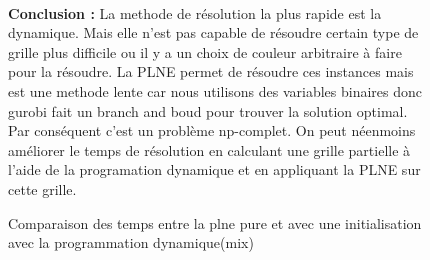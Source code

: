 \documentclass[a4paper]{memoir}
\begin{document}
\begin{figure}[h]
\caption{Comparaison des temps entre la plne pure et avec une initialisation avec la programmation dynamique(mix)}
\\
\textbf{Conclusion : }La methode de résolution la plus rapide est la dynamique. Mais elle n'est pas capable de résoudre certain type de grille plus difficile ou il y a un choix de couleur arbitraire à faire pour la résoudre. La PLNE permet de résoudre ces instances mais est une methode lente car nous utilisons des variables binaires donc gurobi fait un branch and boud pour trouver la solution optimal. Par conséquent c'est un problème np-complet. On peut néenmoins améliorer le temps de résolution en calculant une grille partielle à l'aide de la programation dynamique et en appliquant la PLNE sur cette grille.
\end{figure}

        
\end{document}
